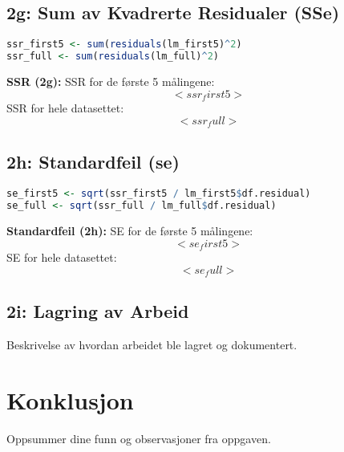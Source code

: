 \documentclass{article}
\begin{document}
\subsection{2g: Sum av Kvadrerte Residualer (SSe)}
\begin{lstlisting}[language=R]
ssr_first5 <- sum(residuals(lm_first5)^2)
ssr_full <- sum(residuals(lm_full)^2)
\end{lstlisting}
\textbf{SSR (2g):} SSR for de første 5 målingene: \[ <ssr_first5> \]
SSR for hele datasettet: \[ <ssr_full> \]

\subsection{2h: Standardfeil (se)}
\begin{lstlisting}[language=R]
se_first5 <- sqrt(ssr_first5 / lm_first5$df.residual)
se_full <- sqrt(ssr_full / lm_full$df.residual)
\end{lstlisting}
\textbf{Standardfeil (2h):} SE for de første 5 målingene: \[ <se_first5> \]
SE for hele datasettet: \[ <se_full> \]

\subsection{2i: Lagring av Arbeid}
Beskrivelse av hvordan arbeidet ble lagret og dokumentert.

\section{Konklusjon}
Oppsummer dine funn og observasjoner fra oppgaven.
\end{document}

